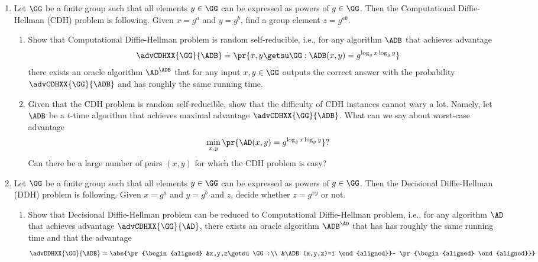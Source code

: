 \documentclass{article}
\begin{document}
\begin{enumerate}
  
\item Let $\GG$ be a finite group such that all elements $y\in\GG$ can
  be expressed as powers of $g\in\GG$. Then the Computational
  Diffie-Hellman (CDH) problem is following. Given $x=g^a$ and
  $y=g^b$, find a group element $z=g^{ab}$.
  \begin{enumerate}
  \item Show that Computational Diffie-Hellman problem is random
    self-reducible, i.e., for any algorithm $\ADB$ that achieves
    advantage
    \begin{align*}
      \advCDHXX{\GG}{\ADB}\doteq\pr{x,y\getsu\GG: \ADB(x,y)=g^{\log_g
          x\log_g y}}
    \end{align*}
    there exists an oracle algorithm $\AD^{\ADB}$ that for any input
    $x,y\in\GG$ outputs the correct answer with the probability
    $\advCDHXX{\GG}{\ADB}$ and has roughly the same running time.
  \item Given that the CDH problem is random self-reducible, show that
    the difficulty of CDH instances cannot wary a lot. Namely, let
    $\ADB$ be a $t$-time algorithm that achieves maximal advantage
    $\advCDHXX{\GG}{\ADB}$. What can we say about worst-case advantage
    \begin{align*}
      \min_{x,y}\pr{\AD(x,y)=g^{\log_g x\log_g y}}?
    \end{align*}
    Can there be a large number of pairs $(x,y)$ for which the CDH problem
    is easy?
  \end{enumerate}
  \item Let $\GG$ be a finite group such that all elements $y\in\GG$ can
  be expressed as powers of $g\in\GG$. Then the Decisional
  Diffie-Hellman (DDH) problem is following. Given $x=g^a$ and
  $y=g^b$ and $z$, decide whether $z=g^{xy}$ or not.
  \begin{enumerate}
  \item Show that Decisional Diffie-Hellman problem can be reduced to
    Computational Diffie-Hellman problem, i.e., for any algorithm
    $\AD$ that achieves advantage $\advCDHXX{\GG}{\AD}$, there exists
    an oracle algorithm $\ADB^{\AD}$ that has has roughly the same
    running time and that the advantage
    \begin{align*}
      \advDDHXX{\GG}{\ADB}\doteq
      \abs{\pr{\begin{aligned}
        &x,y,z\getsu\GG:\\ 
        &\ADB(x,y,z)=1
      \end{aligned}}-
      \pr{\begin{aligned}

\end{aligned}}}
\end{align*}
\end{enumerate}
\end{enumerate}
\end{document}
